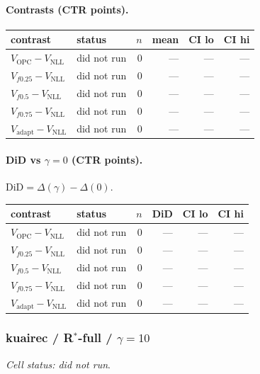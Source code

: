 \documentclass[10pt,a4paper]{article}
\begin{document}
\paragraph{Contrasts (CTR points).}
{\centering\small\begin{tabular}{llrrrr}
\toprule contrast & status & $n$ & mean & CI lo & CI hi \\
\midrule
$V_{\mathrm{OPC}}-V_{\mathrm{NLL}}$ & did not run & 0 & --- & --- & --- \\
$V_{f0.25}-V_{\mathrm{NLL}}$ & did not run & 0 & --- & --- & --- \\
$V_{f0.5}-V_{\mathrm{NLL}}$ & did not run & 0 & --- & --- & --- \\
$V_{f0.75}-V_{\mathrm{NLL}}$ & did not run & 0 & --- & --- & --- \\
$V_{\mathrm{adapt}}-V_{\mathrm{NLL}}$ & did not run & 0 & --- & --- & --- \\
\bottomrule\end{tabular}\par}
\paragraph{DiD vs $\gamma=0$ (CTR points).} $\mathrm{DiD}=\Delta(\gamma)-\Delta(0)$.
{\centering\small\begin{tabular}{llrrrr}
\toprule contrast & status & $n$ & DiD & CI lo & CI hi \\
\midrule
$V_{\mathrm{OPC}}-V_{\mathrm{NLL}}$ & did not run & 0 & --- & --- & --- \\
$V_{f0.25}-V_{\mathrm{NLL}}$ & did not run & 0 & --- & --- & --- \\
$V_{f0.5}-V_{\mathrm{NLL}}$ & did not run & 0 & --- & --- & --- \\
$V_{f0.75}-V_{\mathrm{NLL}}$ & did not run & 0 & --- & --- & --- \\
$V_{\mathrm{adapt}}-V_{\mathrm{NLL}}$ & did not run & 0 & --- & --- & --- \\
\bottomrule\end{tabular}\par}
\bigskip
\subsubsection{kuairec / R$^*$-full / $\gamma=10$}
\emph{Cell status: did not run}.
\end{document}
